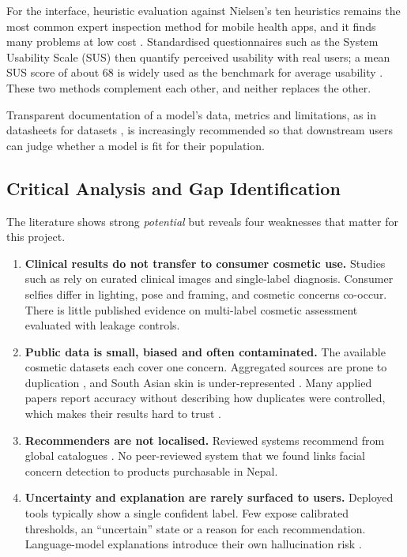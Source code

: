 For the interface, heuristic evaluation against Nielsen's ten heuristics remains the most common expert inspection method for mobile health apps, and it finds many problems at low cost \citep{galavi2024}. Standardised questionnaires such as the System Usability Scale (SUS) then quantify perceived usability with real users; a mean SUS score of about 68 is widely used as the benchmark for average usability \citep{vlachogianni2022}. These two methods complement each other, and neither replaces the other.

Transparent documentation of a model's data, metrics and limitations, as in datasheets for datasets \citep{gebru2021}, is increasingly recommended so that downstream users can judge whether a model is fit for their population.

\subsection{Critical Analysis and Gap Identification}
\label{sec:gap}

The literature shows strong \emph{potential} but reveals four weaknesses that matter for this project.

\begin{enumerate}
  \item \textbf{Clinical results do not transfer to consumer cosmetic use.} Studies such as \citet{liu2020} rely on curated clinical images and single-label diagnosis. Consumer selfies differ in lighting, pose and framing, and cosmetic concerns co-occur. There is little published evidence on multi-label cosmetic assessment evaluated with leakage controls.
  \item \textbf{Public data is small, biased and often contaminated.} The available cosmetic datasets each cover one concern. Aggregated sources are prone to duplication \citep{barz2020}, and South Asian skin is under-represented \citep{groh2021,daneshjou2021,daneshjou2022}. Many applied papers report accuracy without describing how duplicates were controlled, which makes their results hard to trust \citep{kapoor2023}.
  \item \textbf{Recommenders are not localised.} Reviewed systems recommend from global catalogues \citep{ramrakhiani2024}. No peer-reviewed system that we found links facial concern detection to products purchasable in Nepal.
  \item \textbf{Uncertainty and explanation are rarely surfaced to users.} Deployed tools typically show a single confident label. Few expose calibrated thresholds, an ``uncertain'' state or a reason for each recommendation. Language-model explanations introduce their own hallucination risk \citep{ji2023}.
\end{enumerate}

